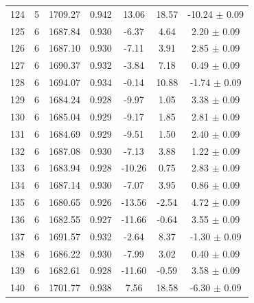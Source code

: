 \begin{longtable}{c c c c c c c}
    124 & 5 & 1709.27 & 0.942 & \cellcolor{aicred}13.06 & \cellcolor{aicred}18.57 & \cellcolor{aicred}-10.24 $\pm$ 0.09 \\
    125 & 6 & 1687.84 & 0.930 & \cellcolor{aicyellow}-6.37 & \cellcolor{aicorange}4.64 & \cellcolor{aicyellow}2.20 $\pm$ 0.09 \\
    126 & 6 & 1687.10 & 0.930 & \cellcolor{aiclightgreen}-7.11 & \cellcolor{aiclightorange}3.91 & \cellcolor{aicyellow}2.85 $\pm$ 0.09 \\
    127 & 6 & 1690.37 & 0.932 & \cellcolor{aiclightyellow}-3.84 & \cellcolor{aiclightred}7.18 & 0.49 $\pm$ 0.09 \\
    128 & 6 & 1694.07 & 0.934 & -0.14 & \cellcolor{aicred}10.88 & \cellcolor{aicorange}-1.74 $\pm$ 0.09 \\
    129 & 6 & 1684.24 & 0.928 & \cellcolor{aiclightgreen}-9.97 & 1.05 & \cellcolor{aiclightgreen}3.38 $\pm$ 0.09 \\
    130 & 6 & 1685.04 & 0.929 & \cellcolor{aiclightgreen}-9.17 & 1.85 & \cellcolor{aicyellow}2.81 $\pm$ 0.09 \\
    131 & 6 & 1684.69 & 0.929 & \cellcolor{aiclightgreen}-9.51 & 1.50 & \cellcolor{aicyellow}2.40 $\pm$ 0.09 \\
    132 & 6 & 1687.08 & 0.930 & \cellcolor{aiclightgreen}-7.13 & \cellcolor{aiclightorange}3.88 & \cellcolor{aicyellow}1.22 $\pm$ 0.09 \\
    133 & 6 & 1683.94 & 0.928 & \cellcolor{aicgreen}-10.26 & 0.75 & \cellcolor{aicyellow}2.83 $\pm$ 0.09 \\
    134 & 6 & 1687.14 & 0.930 & \cellcolor{aiclightgreen}-7.07 & \cellcolor{aiclightorange}3.95 & 0.86 $\pm$ 0.09 \\
    135 & 6 & 1680.65 & 0.926 & \cellcolor{aicgreen}-13.56 & \cellcolor{aiclightyellow}-2.54 & \cellcolor{aiclightgreen}4.72 $\pm$ 0.09 \\
    136 & 6 & 1682.55 & 0.927 & \cellcolor{aicgreen}-11.66 & -0.64 & \cellcolor{aiclightgreen}3.55 $\pm$ 0.09 \\
    137 & 6 & 1691.57 & 0.932 & \cellcolor{aiclightyellow}-2.64 & \cellcolor{aiclightred}8.37 & \cellcolor{aicorange}-1.30 $\pm$ 0.09 \\
    138 & 6 & 1686.22 & 0.930 & \cellcolor{aiclightgreen}-7.99 & \cellcolor{aiclightorange}3.02 & 0.40 $\pm$ 0.09 \\
    139 & 6 & 1682.61 & 0.928 & \cellcolor{aicgreen}-11.60 & -0.59 & \cellcolor{aiclightgreen}3.58 $\pm$ 0.09 \\
    140 & 6 & 1701.77 & 0.938 & \cellcolor{aiclightred}7.56 & \cellcolor{aicred}18.58 & \cellcolor{aicred}-6.30 $\pm$ 0.09 \\

\end{longtable}
